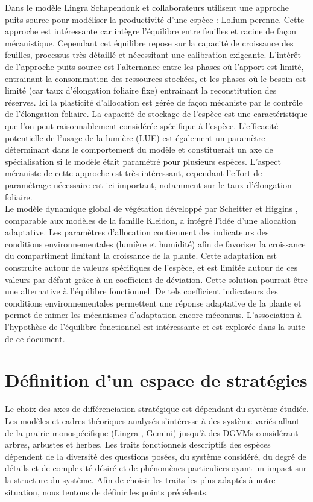 \documentclass[french]{article}
\begin{document}
{\indent Dans le modèle Lingra Schapendonk et collaborateurs \cite{Schapendonk1998} utilisent une approche puits-source pour modéliser la productivité d'une espèce : Lolium perenne. Cette approche est intéressante car intègre l'équilibre entre feuilles et racine de façon mécanistique. Cependant cet équilibre repose sur la capacité de croissance des feuilles, processus très détaillé et nécessitant une calibration exigeante. L'intérêt de l'approche puits-source est l'alternance entre les phases où l'apport est limité, entrainant la consommation des ressources stockées, et les phases où le besoin est limité (car taux d'élongation foliaire fixe) entrainant la reconstitution des réserves. Ici la plasticité d'allocation est gérée de façon mécaniste par le contrôle de l'élongation foliaire. La capacité de stockage de l'espèce est une caractéristique que l'on peut raisonnablement considérée spécifique à l'espèce.  L'efficacité potentielle de l'usage de la lumière (LUE) est également un paramètre déterminant dans le comportement du modèle et constituerait un axe de spécialisation si le modèle était paramétré pour plusieurs espèces. L'aspect mécaniste de cette approche est très intéressant, cependant l'effort de paramétrage nécessaire est ici important, notamment sur le taux d'élongation foliaire.\\

\indent Le modèle dynamique global de végétation développé par Scheitter et Higgins \cite{Scheiter2009}, comparable aux modèles de la famille Kleidon, a intégré l'idée d'une allocation adaptative. Les paramètres d'allocation contiennent des indicateurs des conditions environnementales (lumière et humidité) afin de favoriser la croissance du compartiment limitant la croissance de la plante. Cette adaptation est construite autour de valeurs spécifiques de l'espèce, et est limitée autour de ces valeurs par défaut grâce à un coefficient de déviation. Cette solution pourrait être une alternative à l'équilibre fonctionnel. De tels coefficient indicateurs des conditions environnementales permettent une réponse adaptative de la plante et permet de mimer les mécanismes d'adaptation encore méconnus. L'association à l'hypothèse de l'équilibre fonctionnel est intéressante et est explorée dans la suite de ce document.


\section{Définition d'un espace de stratégies}
Le choix des axes de différenciation stratégique est dépendant du système étudiée. Les modèles et cadres théoriques analysés s'intéresse à des système variés allant de la prairie monospécifique (Lingra \cite{Schapendonk1998}, Gemini\cite{Soussana2012}) jusqu'à des DGVMs considérant arbres, arbustes et herbes. Les traits fonctionnels descriptifs des espèces dépendent de la diversité des questions posées, du système considéré, du degré de détails et de complexité désiré et de phénomènes particuliers ayant un impact sur la structure du système. Afin de choisir les traits les plus adaptés à notre situation, nous tentons de définir les points précédents.

}
\end{document}
